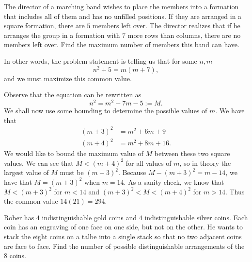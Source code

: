 \documentclass[a4paper, 12pt]{article}
\begin{document}
\begin{chirpbox}
    \begin{problemnum}
        The director of a marching band wishes to place the members into a formation that includes all of them and has no unfilled positions. If they are arranged in a square formation, there are \( 5 \) members left over. The director realizes that if he arranges the group in a formation with \( 7 \) more rows than columns, there are no members left over. Find the maximum number of members this band can have.
    \end{problemnum}
\end{chirpbox}

\begin{solution}
    In other words, the problem statement is telling us that for some \( n,m \)
    \[
        n^2 + 5 = m(m + 7)
    ,\]
    and we must maximize this common value.

    Observe that the equation can be rewritten as
    \[
        n^2 = m^2 + 7m - 5 := M
    .\]
    We shall now use some bounding to determine the possible values of \( m \). We have that
    \begin{align*}
        (m + 3)^2 &= m^2 + 6m + 9 \\
        (m + 4)^2 &= m^2 + 8m + 16
    .\end{align*}
    We would like to bound the maximum value of \( M \) between these two square values. We can see that \( M < (m+4)^2 \) for all values of \( m \), so in theory the largest value of \( M \) must be \( (m+3)^2 \). Because \( M - (m+3)^2 = m - 14 \), we have that \( M = (m+3)^2 \) when \( m = 14 \). As a sanity check, we know that \( M < (m+3)^2 \) for \( m < 14 \) and \( (m+3)^2 < M < (m+4)^2 \) for \( m > 14 \). Thus the common value \( 14(21) = \boxed{294} \).
\end{solution}

\begin{chirpbox}
    \begin{problemnum}
        Rober has \( 4 \) indistinguishable gold coins and \( 4 \) indistinguishable silver coins. Each coin has an engraving of one face on one side, but not on the other. He wants to stack the eight coins on a talbe into a single stack so that no two adjacent coins are face to face. Find the number of possible distinguishable arrangements of the \( 8 \) coins.
    \end{problemnum}
\end{chirpbox}
\end{document}
